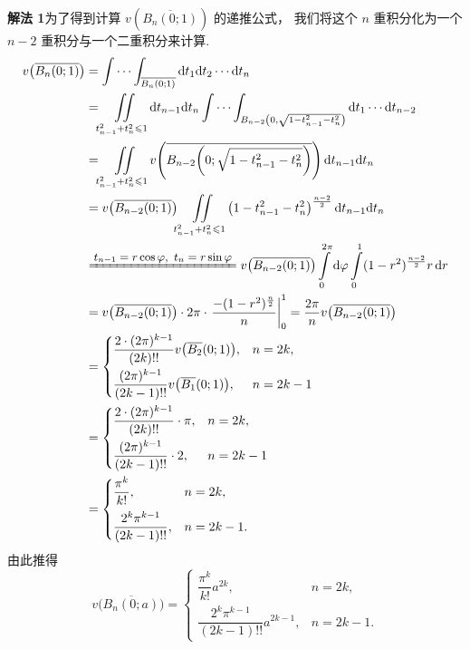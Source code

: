 \begin{example}[$n$ 维球的体积]
\noindent\textbf{解法 1}\quad 为了得到计算 $v(\overline{B_n(0; 1)})$ 的递推公式，
我们将这个 $n$ 重积分化为一个 $n - 2$ 重积分与一个二重积分来计算.
\begin{align*}
v\bigl(\overline{B_n(0; 1)}\bigr)
&= \idotsint _{\overline{B_n(0; 1)}} \mathrm{d}t_1 \mathrm{d}t_2 \cdots \mathrm{d}t_n \notag\\
&= \iint \limits_{t_{n-1}^2 + t_n^2 \leqslant 1} \mathrm{d}t_{n-1} \mathrm{d}t_n
   \idotsint _{B_{n-2}\left(0, \sqrt{1 - t_{n-1}^2 - t_n^2}\right)}
   \mathrm{d}t_1 \cdots \mathrm{d}t_{n-2} \notag\\
&= \iint \limits_{t_{n-1}^2 + t_n^2 \leqslant 1}
   v\!\left( \overline{B_{n-2}\!\left(0; \sqrt{1 - t_{n-1}^2 - t_n^2}\right)} \right)
   \mathrm{d}t_{n-1} \mathrm{d}t_n \notag\\
&= v\bigl(\overline{B_{n-2}(0; 1)}\bigr)
   \iint \limits_{t_{n-1}^2 + t_n^2 \leqslant 1}
   \left( 1 - t_{n-1}^2 - t_n^2 \right)^{\frac{n-2}{2}}
   \mathrm{d}t_{n-1} \mathrm{d}t_n \notag\\
&\reason{$t_{n-1} = r\cos\varphi,\ t_n = r\sin\varphi$}
  v\bigl(\overline{B_{n-2}(0; 1)}\bigr) \int \limits_0^{2\pi} \mathrm{d}\varphi
  \int \limits_0^1 (1 - r^2)^{\frac{n-2}{2}} r \, \mathrm{d}r \notag\\
&= v\bigl(\overline{B_{n-2}(0; 1)}\bigr) \cdot 2\pi \cdot
   \left. \frac{-(1 - r^2)^{\frac{n}{2}}}{n} \right|_0^1
 = \frac{2\pi}{n} v\bigl(\overline{B_{n-2}(0; 1)}\bigr) \notag\\
&= \begin{cases}
  \dfrac{2 \cdot (2\pi)^{k-1}}{(2k)!!} v\bigl(\overline{B_2}(0; 1)\bigr), & n = 2k,\\[8pt]
  \dfrac{(2\pi)^{k-1}}{(2k-1)!!} v\bigl(\overline{B_1}(0; 1)\bigr), & n = 2k - 1
  \end{cases} \notag\\
&= \begin{cases}
  \dfrac{2 \cdot (2\pi)^{k-1}}{(2k)!!} \cdot \pi, & n = 2k,\\[8pt]
  \dfrac{(2\pi)^{k-1}}{(2k-1)!!} \cdot 2, & n = 2k - 1
  \end{cases} \notag\\
&= \begin{cases}
  \dfrac{\pi^k}{k!}, & n = 2k,\\[8pt]
  \dfrac{2^k \pi^{k-1}}{(2k-1)!!}, & n = 2k - 1.
  \end{cases}
\end{align*}
由此推得
\[
v\bigl(\overline{B_n(0; a)}\bigr) =
\begin{cases}
  \dfrac{\pi^k}{k!} a^{2k}, & n = 2k,\\[8pt]
  \dfrac{2^k \pi^{k-1}}{(2k-1)!!} a^{2k-1}, & n = 2k - 1.
\end{cases}
\]


\end{example}
